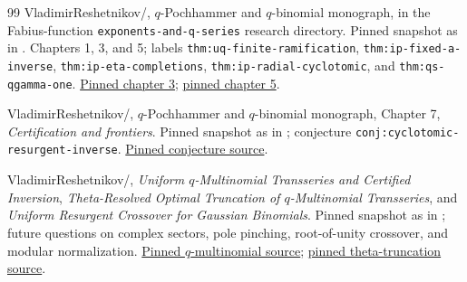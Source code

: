 \begin{thebibliography}{99}
VladimirReshetnikov/\repo{},
\(q\)-Pochhammer and \(q\)-binomial monograph,
in the Fabius-function \texttt{exponents-and-q-series} research
directory.  Pinned snapshot as in \cite{repo-trans}.
Chapters 1, 3, and 5; labels
\texttt{thm:uq-finite-ramification},
\texttt{thm:ip-fixed-a-inverse},
\texttt{thm:ip-eta-completions},
\texttt{thm:ip-radial-cyclotomic},
and \texttt{thm:qs-qgamma-one}.
\href{https://github.com/VladimirReshetnikov/ProveIt/blob/6cb1d86f19ebf9f54c8d985b141b84233b6eab66/Analysis/FabiusFunction/docs/semi-formalized-research-frontiers/drafts/exponents-and-q-series/q_pochhammer_q_binomial_monograph/chapters/03_infinite_q_pochhammer.tex}{Pinned chapter 3};
\href{https://github.com/VladimirReshetnikov/ProveIt/blob/6cb1d86f19ebf9f54c8d985b141b84233b6eab66/Analysis/FabiusFunction/docs/semi-formalized-research-frontiers/drafts/exponents-and-q-series/q_pochhammer_q_binomial_monograph/chapters/05_q_special_functions.tex}{pinned chapter 5}.

VladimirReshetnikov/\repo{},
\(q\)-Pochhammer and \(q\)-binomial monograph,
Chapter 7, \emph{Certification and frontiers}.
Pinned snapshot as in \cite{repo-trans};
conjecture \texttt{conj:cyclotomic-resurgent-inverse}.
\href{https://github.com/VladimirReshetnikov/ProveIt/blob/6cb1d86f19ebf9f54c8d985b141b84233b6eab66/Analysis/FabiusFunction/docs/semi-formalized-research-frontiers/drafts/exponents-and-q-series/q_pochhammer_q_binomial_monograph/chapters/07_certification_and_frontiers.tex}{Pinned conjecture source}.

VladimirReshetnikov/\repo{},
\emph{Uniform \(q\)-Multinomial Transseries and Certified Inversion},
\emph{Theta-Resolved Optimal Truncation of \(q\)-Multinomial
Transseries}, and
\emph{Uniform Resurgent Crossover for Gaussian Binomials}.
Pinned snapshot as in \cite{repo-trans}; future questions on
complex sectors, pole pinching, root-of-unity crossover, and
modular normalization.
\href{https://github.com/VladimirReshetnikov/ProveIt/blob/6cb1d86f19ebf9f54c8d985b141b84233b6eab66/Analysis/Transseries/docs/series-and-transseries/Uniform_q_Multinomial_Certified_Inversion/uniform_q_multinomial_transseries.tex}{Pinned \(q\)-multinomial source};
\href{https://github.com/VladimirReshetnikov/ProveIt/blob/6cb1d86f19ebf9f54c8d985b141b84233b6eab66/Analysis/Transseries/docs/series-and-transseries/Theta_Resolved_Optimal_Truncation_q_Multinomial/article.tex}{pinned theta-truncation source}.

\end{thebibliography}

